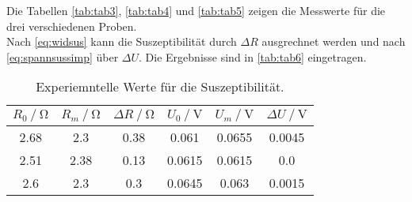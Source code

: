 Die Tabellen \autoref{tab:tab3}, \autoref{tab:tab4} und \autoref{tab:tab5} zeigen die Messwerte für die drei verschiedenen Proben.\\
Nach \eqref{eq:widsus} kann die Suszeptibilität durch $ \Delta R$ ausgrechnet werden und nach \eqref{eq:spannsussimp} über $\Delta U$.
Die Ergebnisse sind in \autoref{tab:tab6} eingetragen.

\begin{table}[H]
    \centering
    \caption{Experiemntelle Werte für die Suszeptibilität.}
    \label{tab:tab6}
    \begin{tabular}{S S S S S S}
      \toprule
        {$ R_0 \mathbin{/} \unit{\ohm} $}&{$R_m \mathbin{/} \unit{\ohm} $}&{$ \Delta R \mathbin{/} \unit{\ohm}$}&{$ U_0 \mathbin{/} \unit{\volt}$}&{$U_m \mathbin{/} \unit{\volt}$}&{$\Delta U \mathbin{/} \unit{\volt}$}\\
        \midrule
        {2.68} & {2.3} &  {0.38}&{0.061} &{0.0655}&{0.0045}\\
        {2.51} & {2.38}&  {0.13}&{0.0615}&{0.0615}&{0.0}\\
        {2.6}  & {2.3} &  {0.3} &{0.0645}&{0.063} &{0.0015}\\
      \bottomrule
    \end{tabular}
\end{table}
